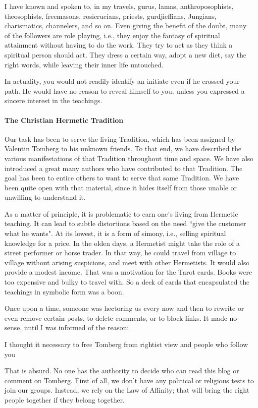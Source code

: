 I have known and spoken to, in my travels, gurus, lamas, anthroposophists, theosophists, freemasons, rosicrucians, priests, gurdjieffians, Jungians, charismatics, channelers, and so on. Even giving the benefit of the doubt, many of the followers are role playing, i.e., they enjoy the fantasy of spiritual attainment without having to do the work. They try to act as they think a spiritual person should act. They dress a certain way, adopt a new diet, say the right words, while leaving their inner life untouched.

In actuality, you would not readily identify an initiate even if he crossed your path. He would have no reason to reveal himself to you, unless you expressed a sincere interest in the teachings.

\paragraph{The Christian Hermetic Tradition}
Our task has been to serve the living Tradition, which has been assigned by Valentin Tomberg to his unknown friends. To that end, we have described the various manifestations of that Tradition throughout time and space. We have also introduced a great many authors who have contributed to that Tradition. The goal has been to entice others to want to serve that same Tradition. We have been quite open with that material, since it hides itself from those unable or unwilling to understand it.

As a matter of principle, it is problematic to earn one's living from Hermetic teaching. It can lead to subtle distortions based on the need ``give the customer what he wants". At its lowest, it is a form of simony, i.e., selling spiritual knowledge for a price. In the olden days, a Hermetist might take the role of a street performer or horse trader. In that way, he could travel from village to village without arising suspicions, and meet with other Hermetists. It would also provide a modest income. That was a motivation for the Tarot cards. Books were too expensive and bulky to travel with. So a deck of cards that encapsulated the teachings in symbolic form was a boon.

Once upon a time, someone was hectoring us every now and then to rewrite or even remove certain posts, to delete comments, or to block links. It made no sense, until I was informed of the reason:

\begin{quotex}
I thought it necessary to free Tomberg from rightist view and people who follow you 

\end{quotex}
That is absurd. No one has the authority to decide who can read this blog or comment on Tomberg. First of all, we don't have any political or religious tests to join our groups. Instead, we rely on the Law of Affinity; that will bring the right people together if they belong together.


